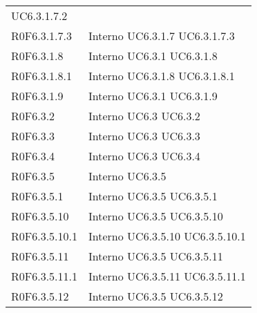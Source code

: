 \begin{longtable}{p{2.5cm}!{\VRule[1pt]}p{2.5cm}}
 \newline UC6.3.1.7.2
 \\
R0F6.3.1.7.3 & Interno \newline UC6.3.1.7
 \newline UC6.3.1.7.3
 \\
R0F6.3.1.8 & Interno \newline UC6.3.1
 \newline UC6.3.1.8
 \\
R0F6.3.1.8.1 & Interno \newline UC6.3.1.8
 \newline UC6.3.1.8.1
 \\
R0F6.3.1.9 & Interno \newline UC6.3.1
 \newline UC6.3.1.9
 \\
R0F6.3.2 & Interno \newline UC6.3
 \newline UC6.3.2
 \\
R0F6.3.3 & Interno \newline UC6.3
 \newline UC6.3.3
 \\
R0F6.3.4 & Interno \newline UC6.3
 \newline UC6.3.4
 \\
R0F6.3.5 & Interno \newline UC6.3.5
 \\
R0F6.3.5.1 & Interno \newline UC6.3.5
 \newline UC6.3.5.1
 \\
R0F6.3.5.10 & Interno \newline UC6.3.5
 \newline UC6.3.5.10
 \\
R0F6.3.5.10.1 & Interno \newline UC6.3.5.10
 \newline UC6.3.5.10.1
 \\
R0F6.3.5.11 & Interno \newline UC6.3.5
 \newline UC6.3.5.11
 \\
R0F6.3.5.11.1 & Interno \newline UC6.3.5.11
 \newline UC6.3.5.11.1
 \\
R0F6.3.5.12 & Interno \newline UC6.3.5
 \newline UC6.3.5.12
 \\

\end{longtable}
